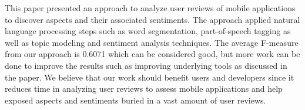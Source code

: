 This paper presented an approach to analyze user reviews of mobile applications to discover aspects and their associated sentiments. The approach applied natural language processing steps such as word segmentation, part-of-speech tagging as well as topic modeling and sentiment analysis techniques. The average F-measure from our approach is 0.6071 which can be considered good, but more work can be done to improve the results such as improving underlying tools as discussed in the paper. We believe that our work should benefit users and developers since it reduces time in analyzing user reviews to assess mobile applications and help exposed aspects and sentiments buried in a vast amount of user reviews. 

